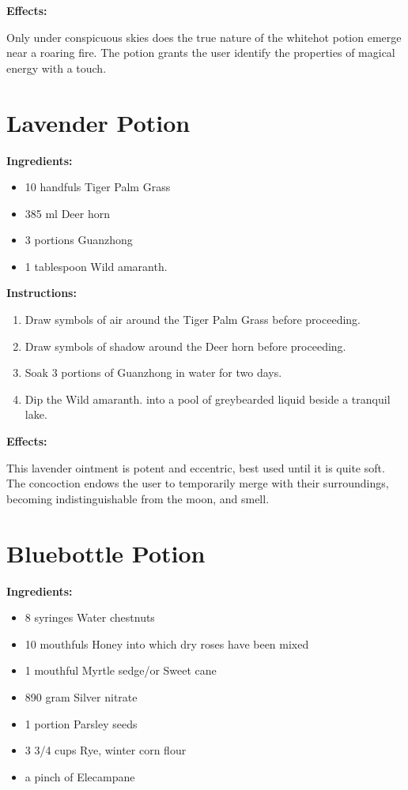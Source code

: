 \documentclass{article}
\begin{document}
\textbf{Effects:}

Only under conspicuous skies does the true nature of the whitehot potion emerge near a roaring fire. The potion grants the user identify the properties of magical energy with a touch.

\newpage
\section*{Lavender Potion}

\textbf{Ingredients:}

\begin{itemize}
  \item 10 handfuls Tiger Palm Grass
  \item 385 ml Deer horn
  \item 3 portions Guanzhong
  \item 1 tablespoon Wild amaranth.
\end{itemize}

\textbf{Instructions:}

\begin{enumerate}
  \item Draw symbols of air around the Tiger Palm Grass before proceeding.
  \item Draw symbols of shadow around the Deer horn before proceeding.
  \item Soak 3 portions of Guanzhong in water for two days.
  \item Dip the Wild amaranth. into a pool of greybearded liquid beside a tranquil lake.
\end{enumerate}

\textbf{Effects:}

This lavender ointment is potent and eccentric, best used until it is quite soft. The concoction endows the user to temporarily merge with their surroundings, becoming indistinguishable from the moon, and smell.

\newpage
\section*{Bluebottle Potion}

\textbf{Ingredients:}

\begin{itemize}
  \item 8 syringes Water chestnuts
  \item 10 mouthfuls Honey into which dry roses have been mixed
  \item 1 mouthful Myrtle sedge/or Sweet cane
  \item 890 gram Silver nitrate
  \item 1 portion Parsley seeds
  \item 3 3/4 cups Rye, winter corn flour
  \item a pinch of Elecampane
\end{itemize}
\end{document}

